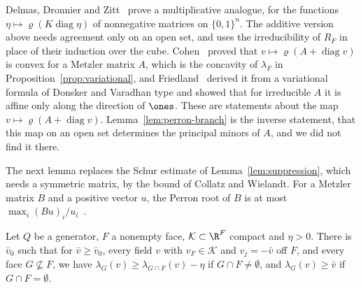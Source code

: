 Delmas, Dronnier and Zitt~\cite[Theorem~2.1]{ddz2024} prove a multiplicative
analogue, for the functions $\eta\mapsto\varrho(K\operatorname{diag}\eta)$ of
nonnegative matrices on $\{0,1\}^n$. The additive version above needs agreement
only on an open set, and uses the irreducibility of $R_F$ in place of their
induction over the cube. Cohen~\cite{cohen1981} proved that
$v\mapsto\varrho(A+\operatorname{diag}v)$ is convex for a Metzler matrix $A$,
which is the concavity of $\lambda_F$ in Proposition~\ref{prop:variational}, and
Friedland~\cite[Theorem~4.1]{friedland1981} derived it from a variational formula
of Donsker and Varadhan type and showed that for irreducible $A$ it is affine only
along the direction of $\ones$. These are statements about the map
$v\mapsto\varrho(A+\operatorname{diag}v)$. Lemma~\ref{lem:perron-branch} is the
inverse statement, that this map on an open set determines the principal minors
of $A$, and we did not find it there.

The next lemma replaces the Schur estimate of Lemma~\ref{lem:suppression},
which needs a symmetric matrix, by the bound of Collatz and Wielandt. For a
Metzler matrix $B$ and a positive vector $u$, the Perron root of $B$ is at most
$\max_i(Bu)_i/u_i$~\cite{bermanplemmons1994}.

\begin{lemma}\label{lem:suppression-nr}
Let $Q$ be a generator, $F$ a nonempty face, $\mathcal K\subset\R^F$ compact
and $\eta>0$. There is $\bar v_0$ such that for $\bar v\ge \bar v_0$, every field $v$ with
$v_F\in\mathcal K$ and $v_j=-\bar v$ off $F$, and every face $G\not\subseteq F$, we
have $\lambda_G(v)\ge\lambda_{G\cap F}(v)-\eta$ if $G\cap F\ne\emptyset$, and
$\lambda_G(v)\ge \bar v$ if $G\cap F=\emptyset$.
\end{lemma}

